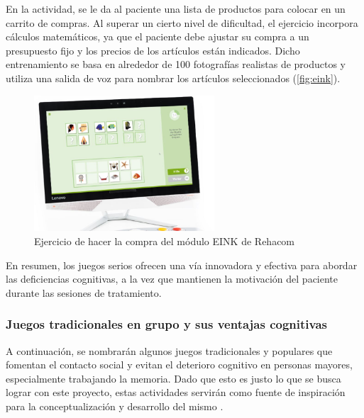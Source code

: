 En la actividad, se le da al paciente una lista de productos para colocar en un carrito de compras. Al superar un cierto nivel de dificultad, el ejercicio incorpora cálculos matemáticos, ya que el paciente debe ajustar su compra a un presupuesto fijo y los precios de los artículos están indicados. Dicho entrenamiento se basa en alrededor de 100 fotografías realistas de productos y utiliza una salida de voz para nombrar los artículos seleccionados (\autoref{fig:eink}).

\begin{figure}[H]
	\centering
	\includegraphics[width=0.6\textwidth]{imgs/EINK.jpg}
	\caption{Ejercicio de hacer la compra del módulo EINK de Rehacom}
	\label{fig:eink}
\end{figure}

En resumen, los juegos serios ofrecen una vía innovadora y efectiva para abordar las deficiencias cognitivas, a la vez que mantienen la motivación del paciente durante las sesiones de tratamiento.

\newpage
\subsubsection{Juegos tradicionales en grupo y sus ventajas cognitivas}

A continuación, se nombrarán algunos juegos tradicionales y populares que fomentan el contacto social y evitan el deterioro cognitivo en personas mayores, especialmente trabajando la memoria. Dado que esto es justo lo que se busca lograr con este proyecto, estas actividades servirán como fuente de inspiración para la conceptualización y desarrollo del mismo \parencite{juegosMem2}.

